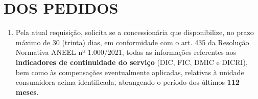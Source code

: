  


\newcommand{\Peticao}{PETIÇÃO DE DOCUMENTOS E INFORMAÇÕES}
\newcommand{\NumeroDoc}{007}








\section{DOS PEDIDOS}

\begin{enumerate}[resume]
  \item Pela atual requisição, solicita se a concessionária que disponibilize, no prazo máximo de 30 (trinta) dias, em conformidade com o art. 435 da Resolução Normativa ANEEL nº 1.000/2021, todas as informações referentes aos \textbf{indicadores de continuidade do serviço} (DIC, FIC, DMIC e DICRI), bem como às compensações eventualmente aplicadas, relativas à unidade consumidora acima identificada, abrangendo o período dos últimos \textbf{112 meses}.
\end{enumerate}





